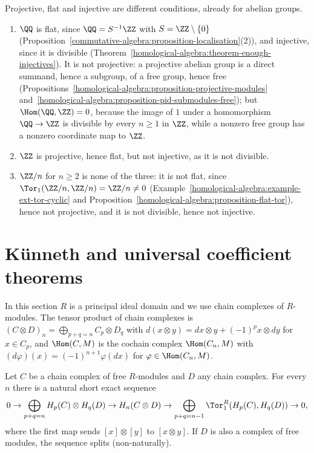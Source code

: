 \begin{counterexample}\label{homological-algebra:counterexample-flat-projective-injective}
Projective, flat and injective are different conditions, already for abelian groups.
\begin{enumerate}
\item $\QQ$ is flat, since $\QQ = S^{-1}\ZZ$ with $S = \ZZ \setminus \{0\}$ (Proposition~\ref{commutative-algebra:proposition-localisation}(2)), and injective, since it is divisible
(Theorem~\ref{homological-algebra:theorem-enough-injectives}). It is not projective: a projective abelian group is a direct summand, hence a subgroup, of a free group, hence free
(Propositions~\ref{homological-algebra:proposition-projective-modules} and~\ref{homological-algebra:proposition-pid-submodules-free}); but $\Hom(\QQ, \ZZ) = 0$, because the image of $1$ under a homomorphism
$\QQ \to \ZZ$ is divisible by every $n \geq 1$ in $\ZZ$, while a nonzero free group has a nonzero coordinate map to $\ZZ$.
\item $\ZZ$ is projective, hence flat, but not injective, as it is not divisible.
\item $\ZZ/n$ for $n \geq 2$ is none of the three: it is not flat, since $\Tor_1(\ZZ/n, \ZZ/n) = \ZZ/n \neq 0$ (Example~\ref{homological-algebra:example-ext-tor-cyclic} and
Proposition~\ref{homological-algebra:proposition-flat-tor}), hence not projective, and it is not divisible, hence not injective.
\end{enumerate}
\end{counterexample}

\section{K\"unneth and universal coefficient theorems}\label{homological-algebra:section-kunneth}

In this section $R$ is a principal ideal domain and we use chain complexes of $R$-modules. The tensor product of chain
complexes is $(C \otimes D)_n = \bigoplus_{p+q=n}C_p \otimes D_q$ with $d(x \otimes y) = dx \otimes y + (-1)^px \otimes dy$ for $x \in C_p$, and
$\Hom(C, M)$ is the cochain complex $\Hom(C_n, M)$ with $(d\varphi)(x) = (-1)^{n+1}\varphi(dx)$ for $\varphi \in \Hom(C_n, M)$.

\begin{theorem}\label{homological-algebra:theorem-kunneth}
Let $C$ be a chain complex of free $R$-modules and $D$ any chain complex. For every $n$ there is a natural short exact sequence
\[
0 \to \bigoplus_{p+q=n}H_p(C) \otimes H_q(D) \to H_n(C \otimes D) \to \bigoplus_{p+q=n-1}\Tor_1^R(H_p(C), H_q(D)) \to 0,
\]
where the first map sends $[x] \otimes [y]$ to $[x \otimes y]$. If $D$ is also a complex of free modules, the sequence splits
(non-naturally).
\end{theorem}

